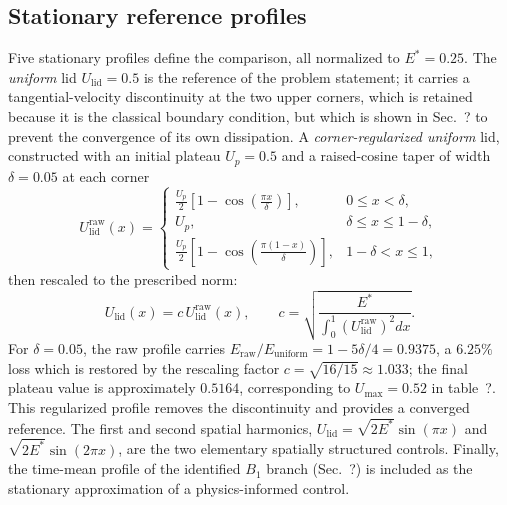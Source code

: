 \documentclass[11pt,a4paper]{article}
\newenvironment{chgdel}{\par\color{red}}{\par\color{black}}
\begin{document}
\subsection{Stationary reference profiles}

\begin{chgdel}
Five stationary profiles define the comparison, all normalized to
$E^\ast=0.25$. The \emph{uniform} lid $U_{\mathrm{lid}}=0.5$ is the reference of
the problem statement; it carries a tangential-velocity discontinuity at the two
upper corners, which is retained because it is the classical boundary condition,
but which is shown in Sec.~? to prevent the convergence of its own
dissipation. A \emph{corner-regularized uniform} lid, constructed with an initial
plateau $U_p=0.5$ and a raised-cosine taper of width $\delta=0.05$ at each corner
\begin{equation}
U_{\mathrm{lid}}^{\mathrm{raw}}(x)=
\begin{cases}
\displaystyle
\frac{U_p}{2}
\left[1-\cos\!\left(\frac{\pi x}{\delta}\right)\right],
& 0\leq x<\delta,\\[6pt]
U_p,
& \delta\leq x\leq 1-\delta,\\[6pt]
\displaystyle
\frac{U_p}{2}
\left[1-\cos\!\left(\frac{\pi(1-x)}{\delta}\right)\right],
& 1-\delta<x\leq 1,
\end{cases}
\end{equation}
then rescaled to the prescribed norm:
\begin{equation}
U_{\mathrm{lid}}(x)=c\,U_{\mathrm{lid}}^{\mathrm{raw}}(x),
\qquad
c=
\sqrt{
\frac{E^\ast}
{\displaystyle\int_0^1
\left(U_{\mathrm{lid}}^{\mathrm{raw}}\right)^2 dx}
}.
\end{equation}
For $\delta=0.05$, the raw profile carries $E_{\mathrm{raw}}/E_{\mathrm{uniform}}
=1-5\delta/4=0.9375$, a $6.25\%$ loss which is restored by the rescaling factor
$c=\sqrt{16/15}\approx 1.033$; the final plateau value is approximately $0.5164$,
corresponding to $U_{\max}=0.52$ in table~?. This regularized
profile removes the discontinuity and provides a converged reference. The first and second spatial harmonics,
$U_{\mathrm{lid}}=\sqrt{2E^\ast}\sin(\pi x)$ and
$\sqrt{2E^\ast}\sin(2\pi x)$, are the two elementary spatially structured
controls. Finally, the time-mean profile of the identified $B_1$ branch
(Sec.~?) is included as the stationary approximation of a
physics-informed control.
\end{chgdel}
\end{document}
